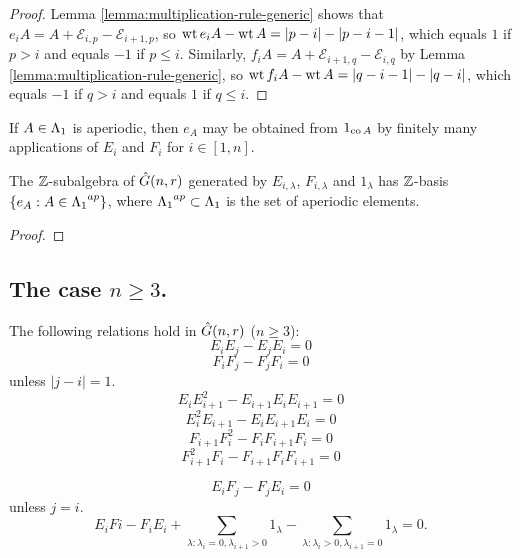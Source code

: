 \documentclass[a4paper, 11pt]{report}
\begin{document}
\begin{proof}
Lemma \ref{lemma:multiplication-rule-generic} shows that $e_iA = A+\mathcal{E}_{i,p}-\mathcal{E}_{i+1,p}$, so $\operatorname{wt}{e_iA} - \operatorname{wt}{A} = |p-i| - |p-i-1|$, which equals $1$ if $p>i$ and equals $-1$ if $p\le i$. Similarly, $f_iA = A + \mathcal{E}_{i+1,q} - \mathcal{E}_{i,q}$ by Lemma \ref{lemma:multiplication-rule-generic}, so $\operatorname{wt}{f_iA} - \operatorname{wt}{A} = |q-i-1| - |q-i|$, which equals $-1$ if $q>i$ and equals $1$ if $q\le i$.
\end{proof}

\begin{lemma}\label{lemma:factorising-aperiodic-elements}
If $A\in{\Lambda_1}$ is aperiodic, then $e_A$ may be obtained from $1_{\operatorname{co}{A}}$ by finitely many applications of $E_i$ and $F_i$ for $i\in[1,n]$.
\end{lemma}

\begin{proposition}
The $\mathbb{Z}$-subalgebra of $\hat{G}(n,r)$ generated by $E_{i,\lambda}$, $F_{i,\lambda}$ and $1_\lambda$ has $\mathbb{Z}$-basis $\{e_A:A\in{\Lambda_1}^{ap}\}$, where ${\Lambda_1}^{ap}\subset{\Lambda_1}$ is the set of aperiodic elements.
\end{proposition}

\begin{proof}

\end{proof}

\subsection{The case $n\geq 3$.}

\begin{lemma}
The following relations hold in $\hat{G}(n,r)$ ($n\geq 3$):
\begin{equation*}
E_iE_j - E_jE_i = 0
\end{equation*}
\begin{equation*}
F_iF_j - F_jF_i = 0
\end{equation*}
unless $|j-i|=1$.
\begin{equation*}
E_iE_{i+1}^2 - E_{i+1}E_iE_{i+1} = 0
\end{equation*}
\begin{equation*}
E_i^2E_{i+1} - E_iE_{i+1}E_i = 0
\end{equation*}
\begin{equation*}
F_{i+1}F_i^2 - F_iF_{i+1}F_i = 0
\end{equation*}
\begin{equation*}
F_{i+1}^2F_i - F_{i+1}F_iF_{i+1} = 0
\end{equation*}

\begin{equation*}
E_iF_j - F_jE_i = 0
\end{equation*}
unless $j=i$.
\begin{equation*}
E_iFi - F_iE_i + \sum_{\lambda:\lambda_i = 0,\lambda_{i+1}>0} 1_\lambda - \sum_{\lambda:\lambda_i>0, \lambda_{i+1}=0} 1_\lambda = 0.
\end{equation*}
\end{lemma}
\end{document}

